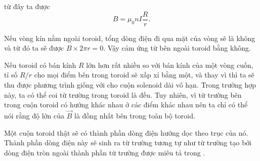 \noindent
từ đây ta được
\begin{equation}\label{eq:6_110}
    B = \mu_0 n I \frac{R}{r}.
\end{equation}

Nếu vòng kín nằm ngoài toroid, tổng dòng điện đi qua mặt của vòng sẽ là không và từ đó ta sẽ được $B\times 2\pi r = 0$. Vậy cảm ứng từ bên ngoài toroid bằng không.

Nếu toroid có bán kính $R$ lớn hơn rất nhiều so với bán kính của một vòng cuốn, tỉ số $R/r$ cho mọi điểm bên trong toroid sẽ xấp xỉ bằng một, và thay vì  thì ta sẽ thu được phương trình giống với  cho cuộn solenoid dài vô hạn. Trong trường hợp này, ta có thể coi từ trường trong toroid là đều. Tuy nhiên, vì từ trường bên trong cuộn toroid có hướng khác nhau ở các điểm khác nhau nên ta chỉ có thể nói rằng độ lớn của $\vec{B}$ là đồng nhất bên trong toàn bộ toroid.

Một cuộn toroid thật sẽ có thành phần dòng điện hướng dọc theo trục của nó. Thành phần dòng điện này sẽ sinh ra từ trường tương tự như từ trường tạo bởi dòng điện tròn ngoài thành phần từ trường được miêu tả trong .
